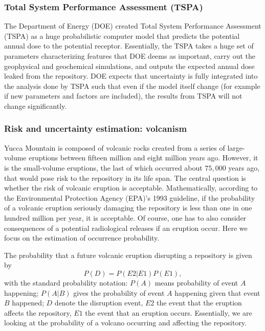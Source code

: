 \documentclass[nofootinbib,preprint,aip,pra]{revtex4-1}
\begin{document}
        \subsubsection{Total System Performance Assessment (TSPA)}
        The Department of Energy (DOE) created Total System Performance Assessment (TSPA) as a huge probabilistic
        computer model that predicts the potential annual dose to the potential receptor.
        Essentially, the TSPA takes a huge set of parameters characterizing features that DOE deems as important,
        carry out the geophysical and geochemical simulations,
        and outputs the expected annual dose leaked from the repository.
        DOE expects that
        uncertainty is fully integrated into the analysis done by TSPA such that even if the model itself change
        (for example if new parameters and factors are included), the results from TSPA will not change
        significantly.\cite{me06,ocrwm02} 

        \subsubsection{Risk and uncertainty estimation: volcanism}
        \label{sec:volcano}
        Yucca Mountain is composed of volcanic rocks created from a series of large-volume eruptions between
        fifteen million and eight million years ago. However, it is the small-volume eruptions, the last of
        which occurred about $75,000$ years ago, that would pose risk to the repository in its life span.
        The central question is whether the risk of volcanic eruption is acceptable. Mathematically,
        according to the Environmental Protection Agency (EPA)'s 1993 guideline,
        if the probability of a volcanic eruption seriously damaging the repository is less than
        one in one hundred million per year, it is acceptable.\cite{epa93}
        Of course, one has to also consider consequences of a potential radiological releases if an eruption
        occur. Here we focus on the estimation of occurrence probability.

        The probability that a future volcanic eruption disrupting a repository is given by
        \begin{equation}
            \label{eq:prob}
            P(D) = P(E2|E1)P(E1),
        \end{equation}
        with the standard probability notation: 
        $P(A)$ means probability of event $A$ happening;
        $P(A|B)$ gives the probability of event $A$ happening given that event $B$ happened;
        $D$ denote the disruption event,
        $E2$ the event that the eruption affects the repository, $E1$ the event that an eruption occurs.
        Essentially, we are looking at the probability of a volcano occurring and affecting the repository.
\end{document}
